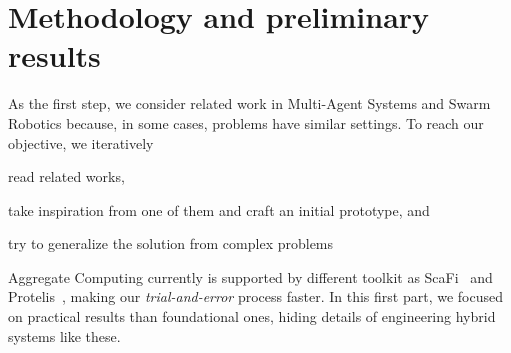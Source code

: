 \documentclass[conference]{IEEEtran}
\begin{document}
\section{Methodology and preliminary results}
%
As the first step, we consider related work in Multi-Agent Systems and Swarm Robotics because, in some cases, problems have similar settings.
To reach our objective, we iteratively 
\begin{enumerate*}[label=(\roman*)]
\item read related works,
\item take inspiration from one of them and craft an initial prototype, and
\item try to generalize the solution from complex problems
\end{enumerate*}
Aggregate Computing currently is supported by different toolkit as ScaFi~\cite{DBLP:conf/ecoop/CasadeiV16} and Protelis~\cite{DBLP:conf/sac/PianiniVB15}, making
our \emph{trial-and-error} process faster. In this first part, we focused on practical results than foundational ones, hiding details of engineering hybrid systems like these.  
\end{document}
